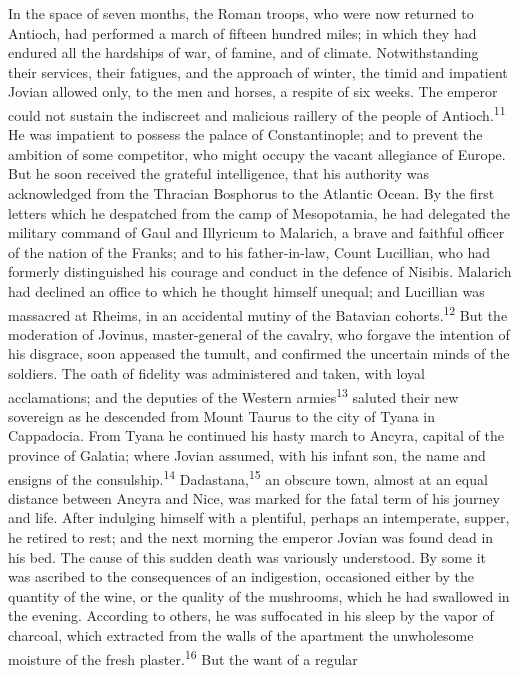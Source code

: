 In the space of seven months, the Roman troops, who were now
returned to Antioch, had performed a march of fifteen hundred
miles; in which they had endured all the hardships of war, of
famine, and of climate. Notwithstanding their services, their
fatigues, and the approach of winter, the timid and impatient
Jovian allowed only, to the men and horses, a respite of six
weeks. The emperor could not sustain the indiscreet and malicious
raillery of the people of Antioch.\textsuperscript{11} He was impatient to possess
the palace of Constantinople; and to prevent the ambition of some
competitor, who might occupy the vacant allegiance of Europe. But
he soon received the grateful intelligence, that his authority
was acknowledged from the Thracian Bosphorus to the Atlantic
Ocean. By the first letters which he despatched from the camp of
Mesopotamia, he had delegated the military command of Gaul and
Illyricum to Malarich, a brave and faithful officer of the nation
of the Franks; and to his father-in-law, Count Lucillian, who had
formerly distinguished his courage and conduct in the defence of
Nisibis. Malarich had declined an office to which he thought
himself unequal; and Lucillian was massacred at Rheims, in an
accidental mutiny of the Batavian cohorts.\textsuperscript{12} But the moderation
of Jovinus, master-general of the cavalry, who forgave the
intention of his disgrace, soon appeased the tumult, and
confirmed the uncertain minds of the soldiers. The oath of
fidelity was administered and taken, with loyal acclamations; and
the deputies of the Western armies\textsuperscript{13} saluted their new sovereign
as he descended from Mount Taurus to the city of Tyana in
Cappadocia. From Tyana he continued his hasty march to Ancyra,
capital of the province of Galatia; where Jovian assumed, with
his infant son, the name and ensigns of the consulship.\textsuperscript{14}
Dadastana,\textsuperscript{15} an obscure town, almost at an equal distance
between Ancyra and Nice, was marked for the fatal term of his
journey and life. After indulging himself with a plentiful,
perhaps an intemperate, supper, he retired to rest; and the next
morning the emperor Jovian was found dead in his bed. The cause
of this sudden death was variously understood. By some it was
ascribed to the consequences of an indigestion, occasioned either
by the quantity of the wine, or the quality of the mushrooms,
which he had swallowed in the evening. According to others, he
was suffocated in his sleep by the vapor of charcoal, which
extracted from the walls of the apartment the unwholesome
moisture of the fresh plaster.\textsuperscript{16} But the want of a regular
